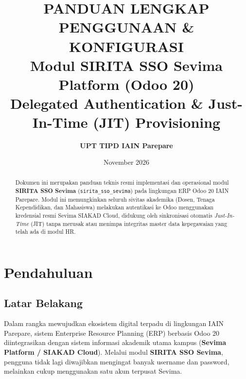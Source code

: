 \documentclass[11pt,a4paper]{article}
\title{
    \vspace{-1.5cm}
    \textbf{\Huge \textcolor{primary}{PANDUAN LENGKAP PENGGUNAAN \& KONFIGURASI}}\\[0.3cm]
    \textbf{\Large Modul SIRITA SSO Sevima Platform (Odoo 20)}\\[0.2cm]
    \large Delegated Authentication \& Just-In-Time (JIT) Provisioning
}
\author{\textbf{UPT TIPD IAIN Parepare}}
\date{November 2026}
\begin{document}
\maketitle
\thispagestyle{fancy}

\begin{abstract}
Dokumen ini merupakan panduan teknis resmi implementasi dan operasional modul \textbf{SIRITA SSO Sevima} (\texttt{sirita\_sso\_sevima}) pada lingkungan ERP Odoo 20 IAIN Parepare. Modul ini memungkinkan seluruh sivitas akademika (Dosen, Tenaga Kependidikan, dan Mahasiswa) melakukan autentikasi ke Odoo menggunakan kredensial resmi Sevima SIAKAD Cloud, didukung oleh sinkronisasi otomatis \textit{Just-In-Time} (JIT) tanpa merusak atau menimpa integritas master data kepegawaian yang telah ada di modul HR.
\end{abstract}

\vspace{0.3cm}
\tableofcontents
\newpage

\section{Pendahuluan}

\subsection{Latar Belakang}
Dalam rangka mewujudkan ekosistem digital terpadu di lingkungan IAIN Parepare, sistem Enterprise Resource Planning (ERP) berbasis Odoo 20 diintegrasikan dengan sistem informasi akademik utama kampus (\textbf{Sevima Platform / SIAKAD Cloud}). Melalui modul \textbf{SIRITA SSO Sevima}, pengguna tidak lagi diwajibkan mengingat banyak username dan password, melainkan cukup menggunakan satu akun terpusat Sevima.
\end{document}
